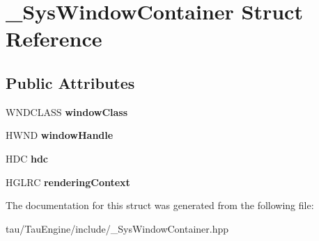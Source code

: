 \hypertarget{struct___sys_window_container}{}\section{\+\_\+\+Sys\+Window\+Container Struct Reference}
\label{struct___sys_window_container}
\subsection*{Public Attributes}
\begin{DoxyCompactItemize}
\item 
\mbox{\label{struct___sys_window_container_a629a7862258aca9876bda74abfd303fd}} 
W\+N\+D\+C\+L\+A\+SS {\bfseries window\+Class}
\item 
\mbox{\label{struct___sys_window_container_a58036c5e1f570ce332b94d2017e01d4a}} 
H\+W\+ND {\bfseries window\+Handle}
\item 
\mbox{\label{struct___sys_window_container_a236b3d0887c4e8ead7ca0d7992431ee8}} 
H\+DC {\bfseries hdc}
\item 
\mbox{\label{struct___sys_window_container_aff1236bea591d960e7bf0e6063ed8c31}} 
H\+G\+L\+RC {\bfseries rendering\+Context}
\end{DoxyCompactItemize}


The documentation for this struct was generated from the following file\+:\begin{DoxyCompactItemize}
\item 
tau/\+Tau\+Engine/include/\+\_\+\+Sys\+Window\+Container.\+hpp\end{DoxyCompactItemize}
